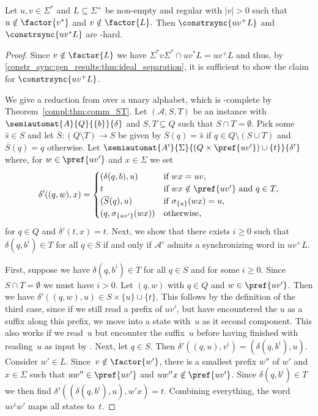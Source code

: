 \begin{theorem} \label{constrsync:thm:NP-hardness}
	Let $u, v \in \Sigma^*$ and $L \subseteq \Sigma^+$ be non-empty and regular
	with $|v| > 0$ such that
	$
	u \notin \factor{v^*}$ and 
	$
	v \notin \factor{L}.
	$
	Then $\constrsync{uv^+L}$ and $\constrsync{uv^*L}$ are \NP-hard.
\end{theorem}
\begin{proof}
	Since $v \notin \factor{L}$
	we have $\Sigma^* v \Sigma^* \cap uv^*L = uv^+L$
	and thus, by \cref{constr_sync:gen_results:thm:ideal_separation},
	it is sufficient to show the claim for $\constrsync{uv^+L}$.
	
	We give a reduction from \DST
	over a unary alphabet, which is \NP-complete by Theorem~\ref{compl:thm:comm_ST}.
	Let $(\mathcal A, S, T)$ be an instance
	with $\semiautomat{A}{Q}{\{b\}}{\delta}$ and $S, T \subseteq Q$
	such that $S \cap T = \emptyset$.
	Pick some $\hat s \in S$
	and let $\overline{S} \colon ( Q \setminus T ) \to S$
	be given by $\overline{S}(q) = \hat{s}$ if $q \in Q \setminus (S \cup T)$
	and $\overline{S}(q) = q$ otherwise. 	
	Let $\semiautomat{A'}{\Sigma}{ ( Q \times \pref{uv'} ) \cup \{t\}}{\delta'}$
	where, for $w \in \pref{uv'}$ and $x \in \Sigma$ we set
	\[ 
	\delta'((q, w), x)
	= \begin{cases}
		(\delta(q, b), u)    & \text{if } wx = uv, \\
		t                    & \text{if } wx \notin \pref{uv'} \text{ and } q \in T, \\
		(\overline{S}(q), u) & \text{if } \sigma_{\{u\}}(wx) = u, \\
		(q, \sigma_{\{uv'\}}(wx)) & \text{otherwise,}
	\end{cases}
	\]
	for $q \in Q$ and $\delta'(t, x) = t$. Next, we show
	that there exists $i \ge 0$ such that $\delta(q, b^i) \in T$
	for all $q \in S$ if and only if $\mathcal A'$ admits a synchronizing word in $uv^+L$.
	
	First, suppose we have $\delta(q, b^i) \in T$ for all $q \in S$
	and for some $i \ge 0$. Since $S\cap T = \emptyset$ we must have $i > 0$.
	Let $(q, w)$ with $q \in Q$ and $w \in \pref{uv'}$.
	Then we have $\delta'((q, w), u) \in S \times \{u\} \cup \{t\}$.
	This follows by the definition of the third case,
	since if we still read a prefix of $uv'$, but have encountered
	the $u$ as a suffix along this prefix, we move into a state with~$u$
	as it second component. This also works if we read~$u$
	but encounter the suffix~$u$ before having finished with reading~$u$ as input 
	by .
	Next, let $q \in S$.
	Then $\delta'((q, u), v^i) = (\delta(q, b^i), u)$.
	Consider $w' \in L$.
	Since~$v \notin \factor{w'}$,
	there is a smallest prefix $w''$ of $w'$ and $x \in \Sigma$
	such that $uw'' \in \pref{uv'}$
	and $uw''x \notin \pref{uv'}$.
	Since $\delta(q, b^i) \in T$
	we then find $\delta'( (\delta(q, b^i), u), w'x ) = t$.
	Combining everything, the word $uv^iw'$ maps
	all states to~$t$.
	

\end{proof}

